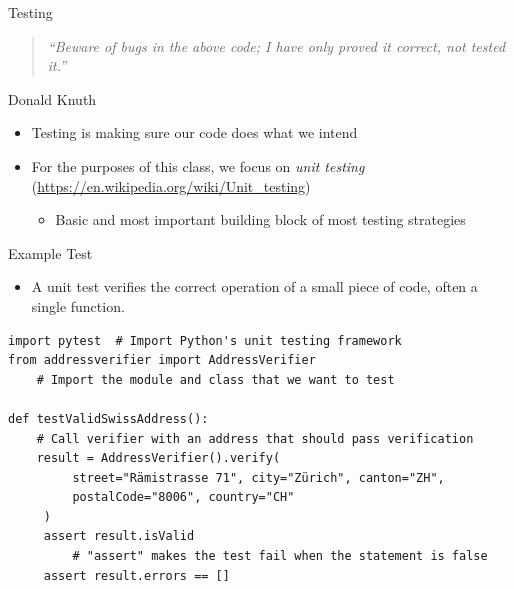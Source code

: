 \documentclass[
ps,
]{prosper}
\begin{document}
\begin{slide}{Testing}

\begin{quote}
\emph{``Beware of bugs in the above code; I have only proved it correct, not tested it.''}
\end{quote}
\hfill Donald Knuth %

\begin{itemize}

\item Testing is making sure our code does what we intend

\item For the purposes of this class, we focus on \textit{unit testing} \\
  (\url{https://en.wikipedia.org/wiki/Unit_testing})

  \begin{itemize}

  \item Basic and most important building block of most testing strategies

  \end{itemize}
    
\end{itemize}

\end{slide}



\begin{slide}{Example Test}

\begin{itemize}
  
\item A unit test verifies the correct operation of a small piece of code, often a single function.

\end{itemize}

\begin{tiny}
\begin{verbatim}
import pytest  # Import Python's unit testing framework
from addressverifier import AddressVerifier 
    # Import the module and class that we want to test

def testValidSwissAddress():
    # Call verifier with an address that should pass verification
    result = AddressVerifier().verify( 
         street="Rämistrasse 71", city="Zürich", canton="ZH",                  
         postalCode="8006", country="CH"              
     )                                 
     assert result.isValid  
         # "assert" makes the test fail when the statement is false
     assert result.errors == [] 
\end{verbatim}
\end{tiny}
  
\end{slide}
\end{document}
